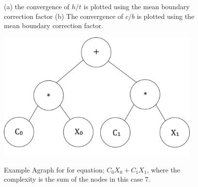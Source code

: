 \begin{figure}%
    \centering
    \qquad
    \caption{(a) the convergence of $h/t$ is plotted using the mean boundary correction factor (b) The convergence of $c/b$ is plotted using the mean boundary correction factor.}%
    \label{fig:convergence_plots}%
\end{figure}


\begin{figure}
    \centering
    \includegraphics[width=4in]{geometry_figures/agraph.png}
    \label{fig:agraph}
    \caption{Example Agraph for for equation; $C_0 X_0 + C_1 X_1$, where the complexity is the sum of the nodes in this case 7.} 
\end{figure}


